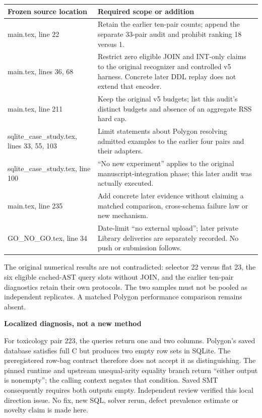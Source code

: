 \documentclass[10pt]{article}
\newcommand{\head}[1]{\medskip\textbf{#1}\par}
\begin{document}
\begin{tabularx}{\textwidth}{>{\raggedright\arraybackslash}p{}X}
\toprule
Frozen source location & Required scope or addition\\
\midrule
main.tex, line 22 & Retain the earlier ten-pair counts; append the separate 33-pair audit and prohibit ranking 18 versus 1.\\
main.tex, lines 36, 68 & Restrict zero eligible JOIN and INT-only claims to the original recognizer and controlled v5 harness. Concrete later DDL replay does not extend that encoder.\\
main.tex, line 211 & Keep the original v5 budgets; list this audit's distinct budgets and absence of an aggregate RSS hard cap.\\
sqlite\_case\_study.tex, lines 33, 55, 103 & Limit statements about Polygon resolving admitted examples to the earlier four pairs and their adapters.\\
sqlite\_case\_study.tex, line 100 & ``No new experiment'' applies to the original manuscript-integration phase; this later audit was actually executed.\\
main.tex, line 235 & Add concrete later evidence without claiming a matched comparison, cross-schema failure law or new mechanism.\\
GO\_NO\_GO.tex, line 34 & Date-limit ``no external upload''; later private Library deliveries are separately recorded. No push or submission follows.\\
\bottomrule
\end{tabularx}

The original numerical results are not contradicted: selector 22 versus flat 23, the six eligible cached-AST query slots without JOIN, and the earlier ten-pair diagnostics retain their own protocols. The two samples must not be pooled as independent replicates. A matched Polygon performance comparison remains absent.

\head{Localized diagnosis, not a new method}
For toxicology pair 223, the queries return one and two columns. Polygon's saved database satisfies full C but produces two empty row sets in SQLite. The preregistered row-bag contract therefore does not accept it as distinguishing. The pinned runtime and upstream unequal-arity equality branch return ``either output is nonempty''; the calling context negates that condition. Saved SMT consequently requires both outputs empty. Independent review verified this local direction issue. No fix, new SQL, solver rerun, defect prevalence estimate or novelty claim is made here.
\end{document}
